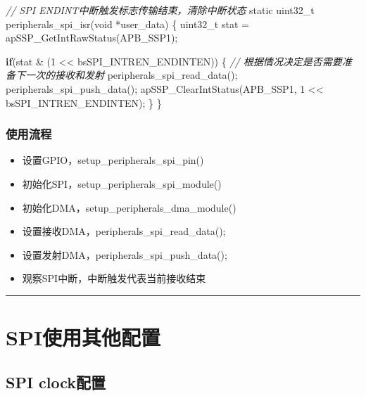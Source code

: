\documentclass[
  12pt,
]{book}
\newenvironment{Shaded}{\begin{snugshade}}{\end{snugshade}}
\newcommand{\CommentTok}[1]{\textcolor[rgb]{0.56,0.35,0.01}{\textit{#1}}}
\newcommand{\ControlFlowTok}[1]{\textcolor[rgb]{0.13,0.29,0.53}{\textbf{#1}}}
\newcommand{\DataTypeTok}[1]{\textcolor[rgb]{0.13,0.29,0.53}{#1}}
\newcommand{\DecValTok}[1]{\textcolor[rgb]{0.00,0.00,0.81}{#1}}
\newcommand{\NormalTok}[1]{#1}
\providecommand{\tightlist}{%
  \setlength{\itemsep}{0pt}\setlength{\parskip}{0pt}}
\begin{document}
\begin{Shaded}
\begin{Highlighting}[]
\CommentTok{// SPI ENDINT中断触发标志传输结束，清除中断状态}
\DataTypeTok{static} \DataTypeTok{uint32_t}\NormalTok{ peripherals_spi_isr(}\DataTypeTok{void}\NormalTok{ *user_data)}
\NormalTok{\{}
  \DataTypeTok{uint32_t}\NormalTok{ stat = apSSP_GetIntRawStatus(APB_SSP1);}
  
  \ControlFlowTok{if}\NormalTok{(stat & (}\DecValTok{1}\NormalTok{ << bsSPI_INTREN_ENDINTEN))}
\NormalTok{  \{}
    \CommentTok{// 根据情况决定是否需要准备下一次的接收和发射}
\NormalTok{    peripherals_spi_read_data();}
\NormalTok{    peripherals_spi_push_data();}
\NormalTok{    apSSP_ClearIntStatus(APB_SSP1, }\DecValTok{1}\NormalTok{ << bsSPI_INTREN_ENDINTEN);}
\NormalTok{  \}  }
\NormalTok{\}}
\end{Highlighting}
\end{Shaded}

\hypertarget{ux4f7fux7528ux6d41ux7a0b-17}{%
\subsubsection{使用流程}\label{ux4f7fux7528ux6d41ux7a0b-17}}

\begin{itemize}
\tightlist
\item
  设置GPIO，setup\_peripherals\_spi\_pin()
\item
  初始化SPI，setup\_peripherals\_spi\_module()
\item
  初始化DMA，setup\_peripherals\_dma\_module()
\item
  设置接收DMA，peripherals\_spi\_read\_data();
\item
  设置发射DMA，peripherals\_spi\_push\_data();
\item
  观察SPI中断，中断触发代表当前接收结束
\end{itemize}

\begin{center}\rule{0.5\linewidth}{0.5pt}\end{center}

\hypertarget{spiux4f7fux7528ux5176ux4ed6ux914dux7f6e}{%
\section{SPI使用其他配置}\label{spiux4f7fux7528ux5176ux4ed6ux914dux7f6e}}

\hypertarget{spi-clockux914dux7f6e}{%
\subsection{SPI clock配置}\label{spi-clockux914dux7f6e}}
\end{document}
